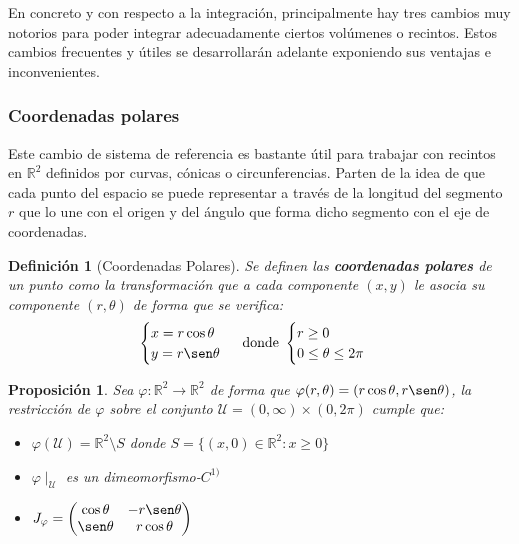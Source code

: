 \documentclass[10pt,a4paper,openright]{book}
\theoremstyle{break}
\newtheorem*{defi}{Definición}
\newtheorem*{prop}{Proposición}
\begin{document}
En concreto y con respecto a la integración, principalmente hay tres cambios muy notorios para poder integrar adecuadamente ciertos volúmenes o recintos. Estos cambios frecuentes y útiles se desarrollarán adelante exponiendo sus ventajas e inconvenientes.

\subsubsection*{Coordenadas polares}
Este cambio de sistema de referencia es bastante útil para trabajar con recintos en $\mathbb{R}^2$ definidos por curvas, cónicas o circunferencias. Parten de la idea de que cada punto del espacio se puede representar a través de la longitud del segmento $r$ que lo une con el origen y del ángulo que forma dicho segmento con el eje de coordenadas.

\begin{defi}[Coordenadas Polares]
Se definen las \textbf{coordenadas polares} de un punto como la transformación que a cada componente $(x,y)$ le asocia su componente $(r, \theta)$ de forma que se verifica:
$$\begin{cases} x = r \cos \theta \\ y = r \sen \theta \end{cases} \mbox{ donde } \begin{cases} r \ge 0\\ 0 \le \theta \le 2\pi \end{cases}$$
\end{defi}

\begin{prop}
Sea $\varphi: \mathbb{R}^2\rightarrow  \mathbb{R}^2$ de forma que $\varphi(r, \theta) = (r\cos\theta, r\sen\theta)$, la restricción de $\varphi$ sobre el conjunto $\mathcal{U} = (0,\infty)\times (0, 2\pi)$ cumple que:
\begin{itemize}
\item $\varphi(\mathcal{U}) = \mathbb{R}^2\setminus{S}$ donde $S = \{(x,0)\in \mathbb{R}^2: x\geq 0\}$
\item $\varphi\mid_\mathcal{U}$ es un dimeomorfismo-$C^{1)}$
\item $J_\varphi = \begin{pmatrix}\cos \theta & -r\sen \theta \\ \sen \theta & r\cos \theta\end{pmatrix}$
\end{itemize}
\end{prop}
\end{document}
